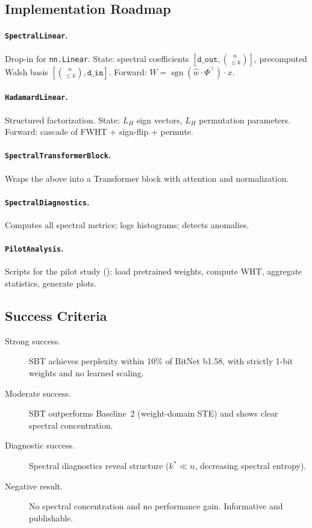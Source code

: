 \documentclass[12pt,a4paper]{article}
\theoremstyle{plain}
\theoremstyle{definition}
\theoremstyle{remark}
\newcommand{\what}{\widehat{w}}
\newcommand{\sgn}{\operatorname{sgn}}
\begin{document}
\subsection{Implementation Roadmap}\label{sec:implementation}

\paragraph{\texttt{SpectralLinear}.}
Drop-in for \texttt{nn.Linear}. State: spectral coefficients $[\texttt{d\_out}, \binom{n}{\leq k}]$, precomputed Walsh basis $[\binom{n}{\leq k}, \texttt{d\_in}]$. Forward: $W = \sgn(\what \cdot \Phi^\top) \cdot x$.

\paragraph{\texttt{HadamardLinear}.}
Structured factorization. State: $L_H$ sign vectors, $L_H$ permutation parameters. Forward: cascade of FWHT + sign-flip + permute.

\paragraph{\texttt{SpectralTransformerBlock}.}
Wraps the above into a Transformer block with attention and normalization.

\paragraph{\texttt{SpectralDiagnostics}.}
Computes all spectral metrics; logs histograms; detects anomalies.

\paragraph{\texttt{PilotAnalysis}.}
Scripts for the pilot study (): load pretrained weights, compute WHT, aggregate statistics, generate plots.

\subsection{Success Criteria}\label{sec:success}

\begin{description}
    \item[Strong success.] SBT achieves perplexity within 10\% of BitNet b1.58, with strictly 1-bit weights and no learned scaling.
    \item[Moderate success.] SBT outperforms Baseline~2 (weight-domain STE) and shows clear spectral concentration.
    \item[Diagnostic success.] Spectral diagnostics reveal structure ($k^* \ll n$, decreasing spectral entropy).
    \item[Negative result.] No spectral concentration and no performance gain. Informative and publishable.
\end{description}
\end{document}
